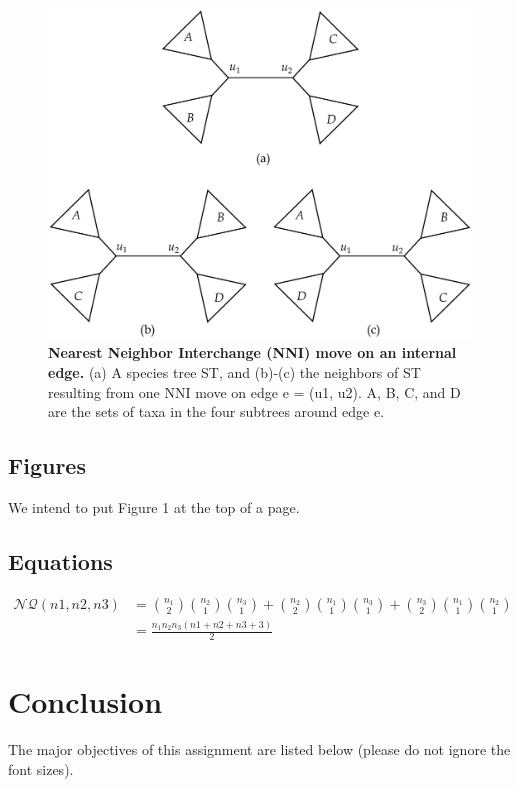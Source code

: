 \documentclass[12pt, a4paper]{article} %
\begin{document}
	
	\begin{figure}[h!]
		\centering
		\includegraphics[scale=0.3]{Figure3.pdf}
		\caption{\textbf{Nearest Neighbor Interchange (NNI) move on an internal edge.} (a)
			A species tree ST, and (b)-(c) the neighbors of ST resulting from one NNI move on edge
			e = (u1, u2). A, B, C, and D are the sets of taxa in the four subtrees around edge e.}
	\end{figure}
	
	\subsection{Figures}
	We intend to put Figure 1 at the top of a page.
	
	\subsection{Equations}
	
\begin{equation}
	\begin{split}
		\mathcal{NQ}(n1,n2,n3) & = \binom{n_1}{2}\binom{n_2}{1}\binom{n_3}{1}+ \binom{n_2}{2}\binom{n_1}{1}\binom{n_3}{1} + \binom{n_3}{2}\binom{n_1}{1}\binom{n_2}{1} \\
		& = \frac{n_1n_2n_3(n1 + n2 + n3 + 3)}{2}
	\end{split}
\end{equation}
	
	\section{Conclusion}
	The major objectives of this assignment are listed below (please do not ignore the font sizes).
\end{document}
